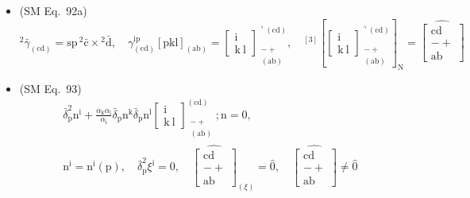 \documentclass[
    12pt,              %
    a4paper,           %
    headings=normal,   %
    twoside=true,      %
    BCOR=8mm,          %
]{scrbook}
\begin{document}
\begin{itemize}[label={},leftmargin=0pt]
    \item (SM Eq.\ 92a) 
    \[
    {}^2\bar{\gamma}_{(\mathrm{cd})} = \mathrm{sp}\,{}^2\bar{\mathrm{c}} \times {}^2\bar{\mathrm{d}}, \quad \gamma_{(\mathrm{cd})}^{\mathrm{ip}}\left[\mathrm{pkl}\right]_{(\mathrm{ab})} = \left[ \begin{smallmatrix} \mathrm{i} \\ \mathrm{k\ l} \end{smallmatrix} \right]^{\urcorner(\mathrm{cd})}_{\substack{- + \\ (\mathrm{ab})}}, \quad {}^{[3]}\left[ \left[ \begin{smallmatrix} \mathrm{i} \\ \mathrm{k\ l} \end{smallmatrix} \right]^{\urcorner(\mathrm{cd})}_{\substack{- + \\ (\mathrm{ab})}} \right]_\mathrm{N} = \widehat{\left[ \begin{smallmatrix} \mathrm{cd} \\ - + \\ \mathrm{ab} \end{smallmatrix} \right]}
    \]

    \item (SM Eq.\ 93) 
    \[
    \begin{gathered}
    \bar{\delta}_\mathrm{p}^2 \mathrm{n^i} + \frac{\alpha_\mathrm{k} \alpha_\mathrm{l}}{\alpha_\mathrm{i}} \bar{\delta}_\mathrm{p} \mathrm{n^k} \bar{\delta}_\mathrm{p} \mathrm{n^l} \left[ \begin{smallmatrix} \mathrm{i} \\ \mathrm{k\ l} \end{smallmatrix} \right]^{(\mathrm{cd})}_{\substack{- + \\ (\mathrm{ab})}} ; \mathrm{n} = 0, \\
    \mathrm{n^i} = \mathrm{n^i}(\mathrm{p}), \quad \bar{\delta}_\mathrm{p}^2 \xi^\mathrm{i} = 0, \quad \widehat{\left[ \begin{smallmatrix} \mathrm{cd} \\ - + \\ \mathrm{ab} \end{smallmatrix} \right]}_{(\xi)} = \hat{0}, \quad \widehat{\left[ \begin{smallmatrix} \mathrm{cd} \\ - + \\ \mathrm{ab} \end{smallmatrix} \right]} \ne \hat{0}
    \end{gathered}
    \]


\end{itemize}
\end{document}
